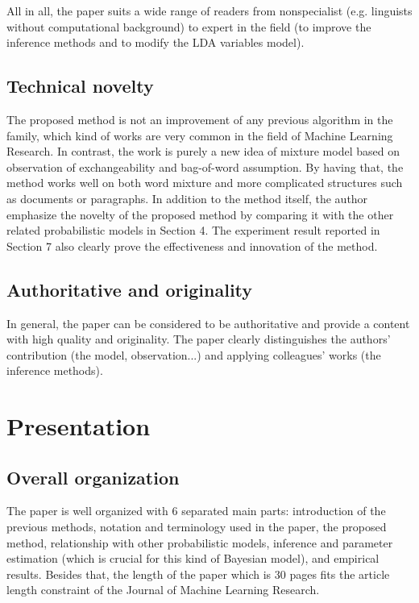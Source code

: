 \documentclass[conference,compsoc]{IEEEtran}
\begin{document}
	All in all, the paper suits a wide range of readers from nonspecialist (e.g. linguists without computational background) to expert in the field (to improve the inference methods and to modify the LDA variables model).
	
	\subsection{Technical novelty}
	The proposed method is not an improvement of any previous algorithm in the family, which kind of works are very common in the field of Machine Learning Research. In contrast, the work is purely a new idea of mixture model based on observation of exchangeability and bag-of-word assumption. By having that, the method works well on both word mixture and more complicated structures such as documents or paragraphs. In addition to the method itself, the author emphasize the novelty of the proposed method by comparing it with the other related probabilistic models in Section 4. The experiment result reported in Section 7 also clearly prove the effectiveness and innovation of the method.
	
	\subsection{Authoritative and originality}
	In general, the paper can be considered to be authoritative and provide a content with high quality and originality. The paper clearly distinguishes the authors' contribution (the model, observation...) and applying colleagues' works (the inference methods).
	
	\section{Presentation}
	\subsection{Overall organization}
	The paper is well organized with 6 separated main parts: introduction of the previous methods, notation and terminology used in the paper, the proposed method, relationship with other probabilistic models, inference and parameter estimation (which is crucial for this kind of Bayesian model), and empirical results. Besides that, the length of the paper which is 30 pages fits the article length constraint of the Journal of Machine Learning Research.
	
\end{document}

